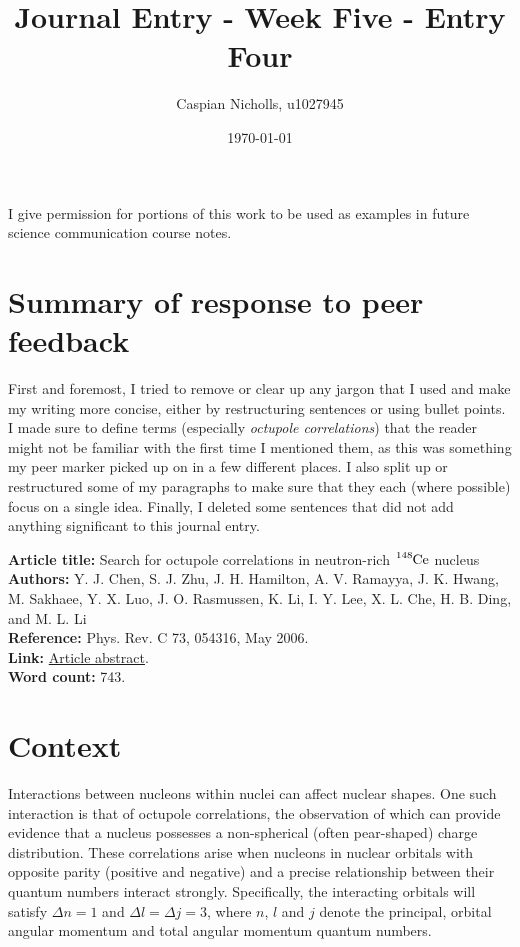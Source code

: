 \documentclass[12pt,a4paper]{article}
\begin{document}
\title{Journal Entry - Week Five - Entry Four}
\author{Caspian Nicholls, u1027945}
\date{\today}

\maketitle

\noindent
I give permission for portions of this work to be used as examples in future science communication course notes.

\section*{Summary of response to peer feedback}

First and foremost, I tried to remove or clear up any jargon that I used and make my writing more concise, either by restructuring sentences or using bullet points.
I made sure to define terms (especially \textit{octupole correlations}) that the reader might not be familiar with the first time I mentioned them, as this was something my peer marker picked up on in a few different places.
I also split up or restructured some of my paragraphs to make sure that they each (where possible) focus on a single idea.
Finally, I deleted some sentences that did not add anything significant to this journal entry.

\bigskip
\noindent
\textbf{Article title:} Search for octupole correlations in neutron-rich $\ce{^{148}Ce}$ nucleus \\
\textbf{Authors:} Y. J. Chen, S. J. Zhu, J. H. Hamilton, A. V. Ramayya, J. K. Hwang, M. Sakhaee, Y. X. Luo, J. O. Rasmussen, K. Li, I. Y. Lee, X. L. Che, H. B. Ding, and M. L. Li \\
\textbf{Reference:} Phys. Rev. C 73, 054316, May 2006. \\
\textbf{Link:}  \href{10.1103/PhysRevC.73.0543 at different energies.16}{Article abstract}. \\
\textbf{Word count:} 743.

\section*{Context}
Interactions between nucleons within nuclei can affect nuclear shapes.
One such interaction is that of octupole correlations, the observation of which can provide evidence that a nucleus possesses a non-spherical (often pear-shaped) charge distribution.
These correlations arise when nucleons in nuclear orbitals with opposite parity (positive and negative) and a precise relationship between their quantum numbers interact strongly.
Specifically, the interacting orbitals will satisfy $\Delta n = 1$ and $\Delta l = \Delta j = 3$, where $n$, $l$ and $j$ denote the principal, orbital angular momentum and total angular momentum quantum numbers.
\end{document}

